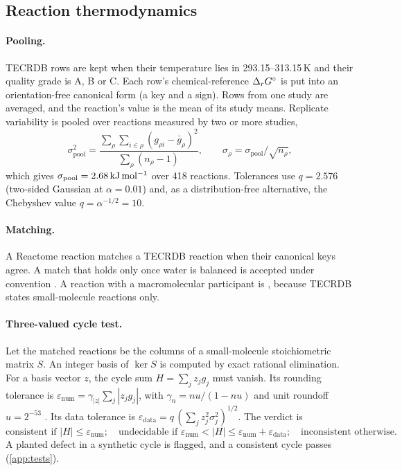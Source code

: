 \subsection{Reaction thermodynamics}
\label{sec:thermo}

\paragraph{Pooling.}
TECRDB rows are kept when their temperature lies in 293.15--313.15\,K and their quality grade is A, B or C.
Each row's chemical-reference $\Delta_r G^\circ$ is put into an orientation-free canonical form (a key and a sign).
Rows from one study are averaged, and the reaction's value is the mean of its study means.
Replicate variability is pooled over reactions measured by two or more studies,
\begin{equation}
  \sigma_{\mathrm{pool}}^2 = \frac{\sum_{\rho}\sum_{i\in\rho}(g_{\rho i}-\bar g_\rho)^2}{\sum_\rho (n_\rho-1)},
  \qquad \sigma_\rho = \sigma_{\mathrm{pool}}/\sqrt{n_\rho},
\end{equation}
which gives $\sigma_{\mathrm{pool}}=2.68\,\mathrm{kJ\,mol^{-1}}$ over 418 reactions.
Tolerances use $q=2.576$ (two-sided Gaussian at $\alpha=0.01$) and, as a distribution-free alternative, the Chebyshev value $q=\alpha^{-1/2}=10$.

\paragraph{Matching.}
A Reactome reaction matches a TECRDB reaction when their canonical keys agree.
A match that holds only once water is balanced is accepted under convention .
A reaction with a macromolecular participant is , because TECRDB states small-molecule reactions only.

\paragraph{Three-valued cycle test.}
Let the matched reactions be the columns of a small-molecule stoichiometric matrix $S$.
An integer basis of $\ker S$ is computed by exact rational elimination.
For a basis vector $z$, the cycle sum $H=\sum_j z_j g_j$ must vanish.
Its rounding tolerance is $\varepsilon_{\mathrm{num}}=\gamma_{|z|}\sum_j|z_j g_j|$, with $\gamma_n=nu/(1-nu)$ and unit roundoff $u=2^{-53}$ \citep{higham2002accuracy}.
Its data tolerance is $\varepsilon_{\mathrm{data}}=q\,(\sum_j z_j^2\sigma_j^2)^{1/2}$.
The verdict is
\begin{equation}
  \text{consistent if } |H|\le\varepsilon_{\mathrm{num}};\quad
  \text{undecidable if } \varepsilon_{\mathrm{num}}<|H|\le\varepsilon_{\mathrm{num}}+\varepsilon_{\mathrm{data}};\quad
  \text{inconsistent otherwise.}
\end{equation}
A planted defect in a synthetic cycle is flagged, and a consistent cycle passes (\cref{app:tests}).

